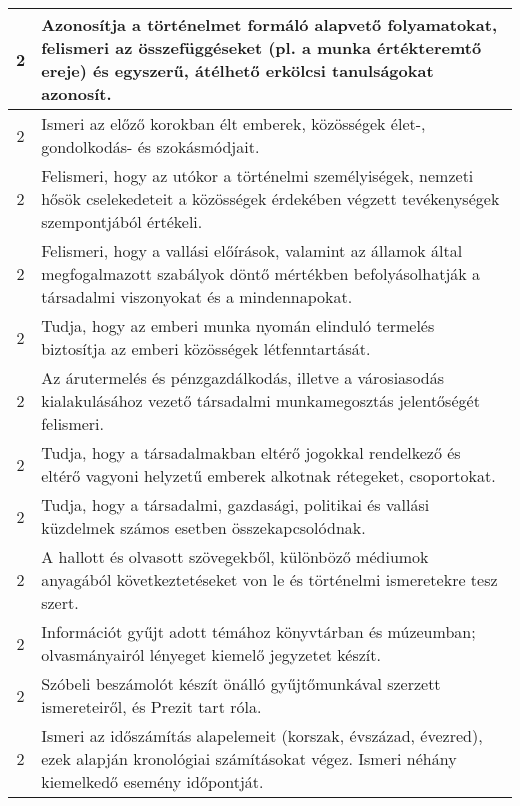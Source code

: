 \begin{longtable}{c | p{12cm} }
                                
                                          2 &  Azonosítja a történelmet formáló alapvető folyamatokat, felismeri az összefüggéseket (pl. a munka értékteremtő ereje) és egyszerű, átélhető erkölcsi tanulságokat azonosít. \\ \hline
                                          2 &  Ismeri az előző korokban élt emberek, közösségek élet-, gondolkodás- és szokásmódjait. \\ \hline
                                          2 &  Felismeri, hogy az utókor a történelmi személyiségek, nemzeti hősök cselekedeteit a közösségek érdekében végzett tevékenységek szempontjából értékeli. \\ \hline
                                          2 &  Felismeri, hogy a vallási előírások, valamint az államok által megfogalmazott szabályok döntő mértékben befolyásolhatják a társadalmi viszonyokat és a mindennapokat. \\ \hline
                                          2 &  Tudja, hogy az emberi munka nyomán elinduló termelés biztosítja az emberi közösségek létfenntartását. \\ \hline
                                          2 &  Az árutermelés és pénzgazdálkodás, illetve a városiasodás kialakulásához vezető társadalmi munkamegosztás jelentőségét felismeri. \\ \hline
                                          2 &  Tudja, hogy a társadalmakban eltérő jogokkal rendelkező és eltérő vagyoni helyzetű emberek alkotnak rétegeket, csoportokat. \\ \hline
                                          2 &  Tudja, hogy a társadalmi, gazdasági, politikai és vallási küzdelmek számos esetben összekapcsolódnak. \\ \hline
                                          2 &  A hallott és olvasott szövegekből, különböző médiumok anyagából következtetéseket von le és történelmi ismeretekre tesz szert. \\ \hline
                                          2 &  Információt gyűjt adott témához könyvtárban és múzeumban; olvasmányairól lényeget kiemelő jegyzetet készít. \\ \hline
                                          2 &  Szóbeli beszámolót készít önálló gyűjtőmunkával szerzett ismereteiről, és Prezit tart róla. \\ \hline
                                          2 &  Ismeri az időszámítás alapelemeit (korszak, évszázad, évezred), ezek alapján kronológiai számításokat végez. Ismeri néhány kiemelkedő esemény időpontját. \\ \hline
                                      

\end{longtable}

